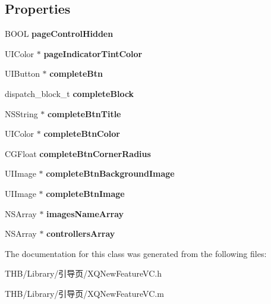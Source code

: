 \subsection*{Properties}
\begin{DoxyCompactItemize}
\item 
\mbox{\label{interface_x_q_new_feature_v_c_a4a0ffe08608d2c7a49e277d0ba659186}} 
B\+O\+OL {\bfseries page\+Control\+Hidden}
\item 
\mbox{\label{interface_x_q_new_feature_v_c_a9653477e4f0dbefc618a13af7c1ae53a}} 
U\+I\+Color $\ast$ {\bfseries page\+Indicator\+Tint\+Color}
\item 
\mbox{\label{interface_x_q_new_feature_v_c_af02ae019615738d918c61b9c505fb839}} 
U\+I\+Button $\ast$ {\bfseries complete\+Btn}
\item 
\mbox{\label{interface_x_q_new_feature_v_c_af14b749e2afaada542e457595ddffb10}} 
dispatch\+\_\+block\+\_\+t {\bfseries complete\+Block}
\item 
\mbox{\label{interface_x_q_new_feature_v_c_a680904347966362913f23b673b80f01b}} 
N\+S\+String $\ast$ {\bfseries complete\+Btn\+Title}
\item 
\mbox{\label{interface_x_q_new_feature_v_c_a6a13ef726c11c9baa8ca8b5ca1390391}} 
U\+I\+Color $\ast$ {\bfseries complete\+Btn\+Color}
\item 
\mbox{\label{interface_x_q_new_feature_v_c_a722bd371b8d7717aea1b527f82d07a71}} 
C\+G\+Float {\bfseries complete\+Btn\+Corner\+Radius}
\item 
\mbox{\label{interface_x_q_new_feature_v_c_af4aed5f29546b23f8161ca1efb86c1b0}} 
U\+I\+Image $\ast$ {\bfseries complete\+Btn\+Background\+Image}
\item 
\mbox{\label{interface_x_q_new_feature_v_c_a62e9b3709cfd9dd373a8399862c6cef1}} 
U\+I\+Image $\ast$ {\bfseries complete\+Btn\+Image}
\item 
\mbox{\label{interface_x_q_new_feature_v_c_a25c156bbfb7608d761d95b027799cba3}} 
N\+S\+Array $\ast$ {\bfseries images\+Name\+Array}
\item 
\mbox{\label{interface_x_q_new_feature_v_c_a5e668edfb9b4ab84f6eed6402a2d7dcc}} 
N\+S\+Array $\ast$ {\bfseries controllers\+Array}
\end{DoxyCompactItemize}


The documentation for this class was generated from the following files\+:\begin{DoxyCompactItemize}
\item 
T\+H\+B/\+Library/引导页/X\+Q\+New\+Feature\+V\+C.\+h\item 
T\+H\+B/\+Library/引导页/X\+Q\+New\+Feature\+V\+C.\+m\end{DoxyCompactItemize}

